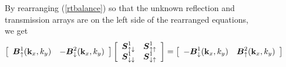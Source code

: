 \begin{figure}
{\begin{minipage} {140.0mm}
By rearranging (\ref{rtbalance}) so that the unknown 
reflection and transmission arrays are on the left side of the rearranged 
equations, we get
\begin{equation} \label{rtbalance1}
\left[{\begin{array}{cc}{\mbox{\boldmath$\mit B$\unboldmath}}_{ \uparrow 
}^{1}({\bf k}_{x},{k}_{y})&-{\mbox{\boldmath$\mit B$\unboldmath}}_{ \downarrow 
}^{2}({\bf k}_{x},{k}_{y})\end{array}}\right]\left[{\begin{array}{cc}{\mbox{\boldmath$\mit S$\unboldmath}}^{1}_{ 
\uparrow \downarrow }&{\mbox{\boldmath$\mit S$\unboldmath}}^{1}_{ \uparrow \uparrow }\\ {\mbox{\boldmath$\mit S$\unboldmath}}^{1}_{ \downarrow 
\downarrow }&{\mbox{\boldmath$\mit S$\unboldmath}}^{1}_{ \downarrow \uparrow 
}\end{array}}\right]=\left[{\begin{array}{cc}-{\mbox{\boldmath$\mit B$\unboldmath}}_{ \downarrow 
}^{1}({\bf k}_{x},{k}_{y})&{\mbox{\boldmath$\mit B$\unboldmath}}_{ \uparrow 
}^{2}({\bf k}_{x},{k}_{y})\end{array}}\right]
\end{equation} 


\end{minipage}}
\end{figure}
